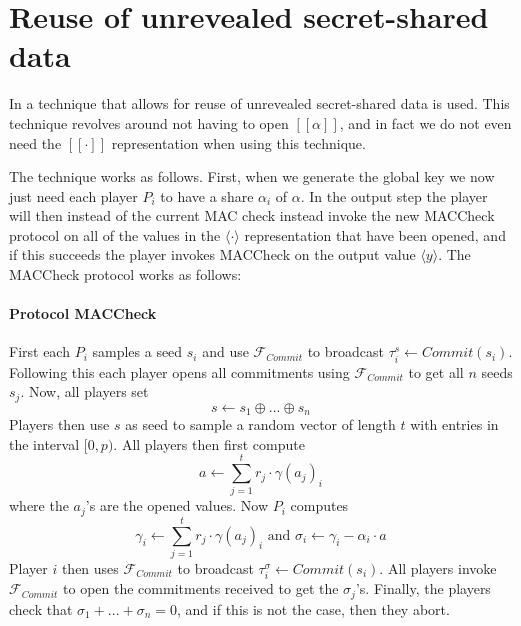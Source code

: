 \documentclass[../main.tex]{subfiles}
\begin{document}

\section{Reuse of unrevealed secret-shared data} \label{section: Reuse}
In \cite{damgaard2013practical} a technique that allows for reuse of unrevealed secret-shared data is used. This technique revolves around not having to open $[\![ \alpha ]\!]$, and in fact we do not even need the $[\![ \cdot ]\!]$ representation when using this technique.

The technique works as follows. First, when we generate the global key we now just need each player $P_i$ to have a share $\alpha_i$ of $\alpha$. In the output step the player will then instead of the current MAC check instead invoke the new MACCheck protocol on all of the values in the $\langle \cdot \rangle$ representation that have been opened, and if this succeeds the player invokes MACCheck on the output value $\langle y \rangle$. The MACCheck protocol works as follows:
\paragraph{Protocol MACCheck}
First each $P_i$ samples a seed $s_i$ and use $\mathcal{F}_{Commit}$ to broadcast $\tau^s_i \leftarrow Commit(s_i)$. Following this each player opens all commitments using $\mathcal{F}_{Commit}$ to get all $n$ seeds $s_j$. Now, all players set $$s \leftarrow s_1 \oplus ... \oplus s_n$$
Players then use $s$ as seed to sample a random vector of length $t$ with entries in the interval $[0, p)$. %
All players then first compute $$a \leftarrow \sum^t_{j = 1} r_j \cdot \gamma(a_j)_i$$ where the $a_j$'s are the opened values.
Now $P_i$ computes $$\gamma_i \leftarrow \sum^t_{j = 1} r_j \cdot \gamma(a_j)_i \text{  and  } \sigma_i \leftarrow \gamma_i - \alpha_i \cdot a$$
Player $i$ then uses $\mathcal{F}_{Commit}$ to broadcast $\tau^\sigma_i \leftarrow Commit(s_i)$.
All players invoke $\mathcal{F}_{Commit}$ to open the commitments received to get the $\sigma_j$'s.
Finally, the players check that $\sigma_1 + ... + \sigma_n = 0$, and if this is not the case, then they abort.
\end{document}
